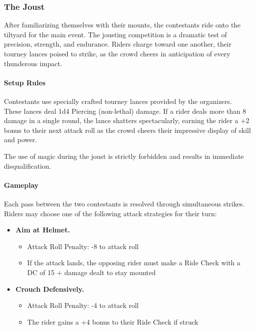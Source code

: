 \subsubsection*{The Joust}
{\entryfont After familiarizing themselves with their mounts, the contestants ride onto the tiltyard for the main event. The jousting competition is a dramatic test of precision, strength, and endurance. Riders charge toward one another, their tourney lances poised to strike, as the crowd cheers in anticipation of every thunderous impact.

\paragraph*{Setup Rules} Contestants use specially crafted tourney lances provided by the organizers. These lances deal 1d4 Piercing (non-lethal) damage. If a rider deals more than 8 damage in a single round, the lance shatters spectacularly, earning the rider a +2 bonus to their next attack roll as the crowd cheers their impressive display of skill and power.

The use of magic during the joust is strictly forbidden and results in immediate disqualification.

\paragraph*{Gameplay} Each pass between the two contestants is resolved through simultaneous strikes. Riders may choose one of the following attack strategies for their turn:

\begin{itemize}
	\renewcommand\labelitemi{\textbf{\textbullet}}
	\item \textbf{Aim at Helmet.}
	\begin{itemize}
		\item Attack Roll Penalty: -8 to attack roll
		\item If the attack lands, the opposing rider must make a Ride Check with a DC of 15 + damage dealt to stay mounted
	\end{itemize}
	\item \textbf{Crouch Defensively.}
	\begin{itemize}
		\item Attack Roll Penalty: -4 to attack roll
		\item The rider gains a +4 bonus to their Ride Check if struck
	\end{itemize}
\end{itemize}

}
